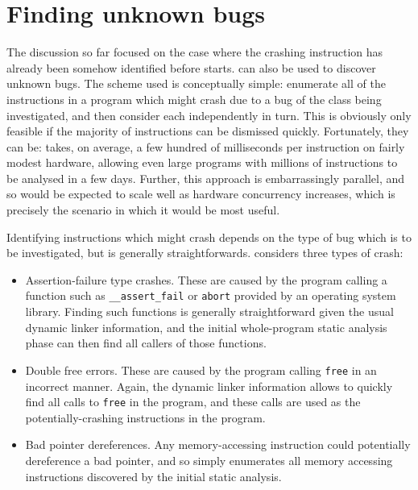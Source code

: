 \section{Finding unknown bugs}
\label{sect:derive:unknown_bugs}


The discussion so far focused on the case where the crashing
instruction has already been somehow identified before {\technique}
starts.  {\Technique} can also be used to discover unknown bugs.  The
scheme used is conceptually simple: enumerate all of the instructions
in a program which might crash due to a bug of the class being
investigated, and then consider each independently in turn.  This is
obviously only feasible if the majority of instructions can be
dismissed quickly.  Fortunately, they can be: {\implementation} takes,
on average, a few hundred of milliseconds per instruction on fairly
modest hardware, allowing even large programs with millions of
instructions to be analysed in a few days.  Further, this approach is
embarrassingly parallel, and so would be expected to scale well as
hardware concurrency increases, which is precisely the scenario in
which it would be most useful.

Identifying instructions which might crash depends on the type of bug
which is to be investigated, but is generally straightforwards.
{\Implementation} considers three types of crash:

\begin{itemize}
\item Assertion-failure type crashes.  These are caused by the program
  calling a function such as \verb|__assert_fail| or \verb|abort|
  provided by an operating system library.  Finding such functions is
  generally straightforward given the usual dynamic linker
  information, and the initial whole-program static analysis phase can
  then find all callers of those functions.
\item Double free errors.  These are caused by the program calling
  \verb|free| in an incorrect manner.  Again, the dynamic linker
  information allows {\implementation} to quickly find all calls to
  \verb|free| in the program, and these calls are used as the
  potentially-crashing instructions in the program.
\item Bad pointer dereferences.  Any memory-accessing instruction
  could potentially dereference a bad pointer, and so
  {\implementation} simply enumerates all memory accessing
  instructions discovered by the initial static analysis.
\end{itemize}

